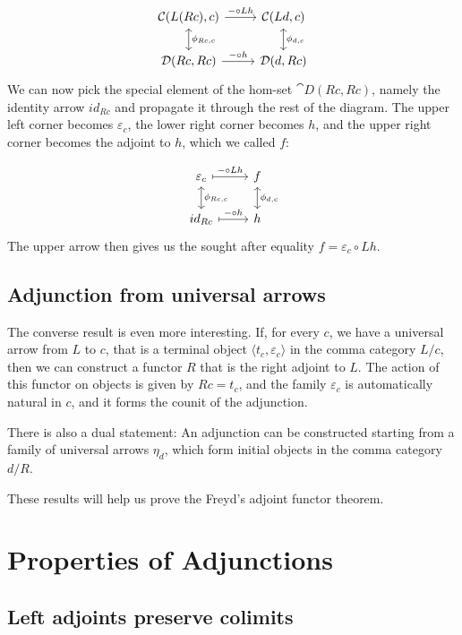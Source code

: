 \documentclass[DaoFP]{subfiles}
\begin{document}
\[
 \begin{tikzcd}
 \mathcal{C}(L (R c), c)
 \arrow[d, leftrightarrow, "\phi_{R c, c}"]
 \arrow[r, "- \circ L h"]
 &
 \mathcal{C}(L d, c)
  \arrow[d, leftrightarrow, "\phi_{d, c}"]
 \\
 \mathcal{D}(R c, R c)
 \arrow[r, "- \circ h"]
& \mathcal{D}(d, R c)
 \end{tikzcd}
\]
We can now pick the special element of the hom-set $\cat D(R c, R c)$, namely the identity arrow $id_{R c}$ and propagate it through the rest of the diagram. The upper left corner becomes $\varepsilon_c$, the lower right corner becomes $h$, and the upper right corner becomes the adjoint to $h$, which we called $f$:

\[
 \begin{tikzcd}
\varepsilon_c
 \arrow[d, leftrightarrow, "\phi_{R c, c}"]
 \arrow[r, maps to, "- \circ L h"]
 &
f
  \arrow[d, leftrightarrow, "\phi_{d, c}"]
 \\
id_{R c}
 \arrow[r, maps to, "- \circ h"]
& h
 \end{tikzcd}
\]
The upper arrow then gives us the sought after equality $f = \varepsilon_c \circ L h$.

\subsection{Adjunction from universal arrows}

The converse result is even more interesting. If, for every $c$, we have a universal arrow from $L$ to $c$, that is a terminal object $\langle t_c, \varepsilon_c \rangle$ in the comma category $L/c$, then we can construct a functor $R$ that is the right adjoint to $L$. The action of this functor on objects is given by $R c = t_c$, and the family $\varepsilon_c$ is automatically natural in $c$, and it forms the counit of the adjunction.

There is also a dual statement: An adjunction can be constructed starting from a family of universal arrows $\eta_d$, which form initial objects in the comma category $d/R$. 

These results will help us prove the Freyd's adjoint functor theorem. 

\section{Properties of Adjunctions}

\subsection{Left adjoints preserve colimits}
\end{document}
